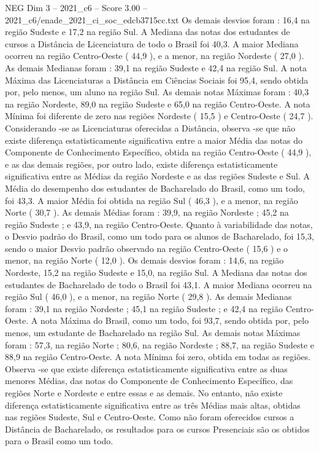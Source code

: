\begin{textsample}{NEG Dim 3 – 2021\_c6 – Score 3.00 – 2021\_c6/enade\_2021\_ci\_soc\_edcb3715cc.txt}
Os demais desvios foram : 16,4 na região Sudeste e 17,2 na região Sul.
A Mediana das notas dos estudantes de cursos a Distância de Licenciatura de todo o Brasil foi 40,3.
A maior Mediana ocorreu na região Centro-Oeste ( 44,9 ), e a menor, na região Nordeste ( 27,0 ).
As demais Medianas foram : 39,1 na região Sudeste e 42,4 na região Sul.
A nota Máxima das Licenciaturas a Distância em Ciências Sociais foi 95,4, sendo obtida por, pelo menos, um aluno na região Sul.
As demais notas Máximas foram : 40,3 na região Nordeste, 89,0 na região Sudeste e 65,0 na região Centro-Oeste.
A nota Mínima foi diferente de zero nas regiões Nordeste ( 15,5 ) e Centro-Oeste ( 24,7 ).
Considerando -se as Licenciaturas oferecidas a Distância, observa -se que não existe diferença estatisticamente significativa entre a maior Média das notas do Componente de Conhecimento Específico, obtida na região Centro-Oeste ( 44,9 ), e as das demais regiões, por outro lado, existe diferença estatisticamente significativa entre as Médias da região Nordeste e as das regiões Sudeste e Sul.
A Média do desempenho dos estudantes de Bacharelado do Brasil, como um todo, foi 43,3.
A maior Média foi obtida na região Sul ( 46,3 ), e a menor, na região Norte ( 30,7 ).
As demais Médias foram : 39,9, na região Nordeste ; 45,2 na região Sudeste ; e 43,9, na região Centro-Oeste.
Quanto à variabilidade das notas, o Desvio padrão do Brasil, como um todo para os alunos de Bacharelado, foi 15,3, sendo o maior Desvio padrão observado na região Centro-Oeste ( 15,6 ) e o menor, na região Norte ( 12,0 ).
Os demais desvios foram : 14,6, na região Nordeste, 15,2 na região Sudeste e 15,0, na região Sul.
A Mediana das notas dos estudantes de Bacharelado de todo o Brasil foi 43,1.
A maior Mediana ocorreu na região Sul ( 46,0 ), e a menor, na região Norte ( 29,8 ).
As demais Medianas foram : 39,1 na região Nordeste ; 45,1 na região Sudeste ; e 42,4 na região Centro-Oeste.
A nota Máxima do Brasil, como um todo, foi 93,7, sendo obtida por, pelo menos, um estudante de Bacharelado na região Sul.
As demais notas Máximas foram : 57,3, na região Norte ; 80,6, na região Nordeste ; 88,7, na região Sudeste e 88,9 na região Centro-Oeste.
A nota Mínima foi zero, obtida em todas as regiões.
Observa -se que existe diferença estatisticamente significativa entre as duas menores Médias, das notas do Componente de Conhecimento Específico, das regiões Norte e Nordeste e entre essas e as demais.
No entanto, não existe diferença estatisticamente significativa entre as três Médias mais altas, obtidas nas regiões Sudeste, Sul e Centro-Oeste.
Como não foram oferecidos cursos a Distância de Bacharelado, os resultados para os cursos Presenciais são os obtidos para o Brasil como um todo.

\end{textsample}
